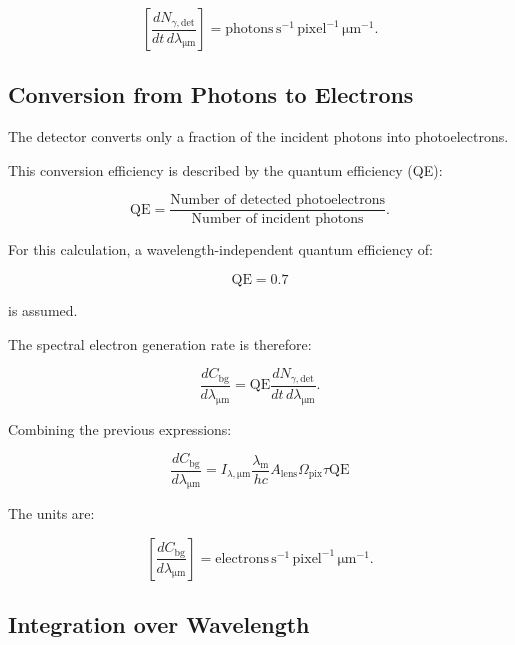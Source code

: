 \documentclass{article}
\begin{document}
\begin{equation}
\left[
\frac{dN_{\gamma,\mathrm{det}}}
{dt\,d\lambda_{\mathrm{\mu m}}}
\right]
=
\mathrm{photons\,s^{-1}\,pixel^{-1}\,\mu m^{-1}}.
\end{equation}

\subsection{Conversion from Photons to Electrons}

The detector converts only a fraction of the incident photons into photoelectrons.

This conversion efficiency is described by the quantum efficiency (QE):

\begin{equation}
\mathrm{QE}
=
\frac{\text{Number of detected photoelectrons}}
{\text{Number of incident photons}}.
\end{equation}

For this calculation, a wavelength-independent quantum efficiency of:

\begin{equation}
\mathrm{QE}=0.7
\end{equation}

is assumed.

The spectral electron generation rate is therefore:

\begin{equation}
\frac{dC_{\mathrm{bg}}}
{d\lambda_{\mathrm{\mu m}}}
=
\mathrm{QE}
\frac{dN_{\gamma,\mathrm{det}}}
{dt\,d\lambda_{\mathrm{\mu m}}}.
\end{equation}

Combining the previous expressions:

\begin{equation}
\boxed{
\frac{dC_{\mathrm{bg}}}
{d\lambda_{\mathrm{\mu m}}}
=
I_{\lambda,\mathrm{\mu m}}
\frac{\lambda_{\mathrm{m}}}{hc}
A_{\mathrm{lens}}
\Omega_{\mathrm{pix}}
\tau
\mathrm{QE}
}
\end{equation}

The units are:

\begin{equation}
\left[
\frac{dC_{\mathrm{bg}}}
{d\lambda_{\mathrm{\mu m}}}
\right]
=
\mathrm{electrons\,s^{-1}\,pixel^{-1}\,\mu m^{-1}}.
\end{equation}

\subsection{Integration over Wavelength}
\end{document}
